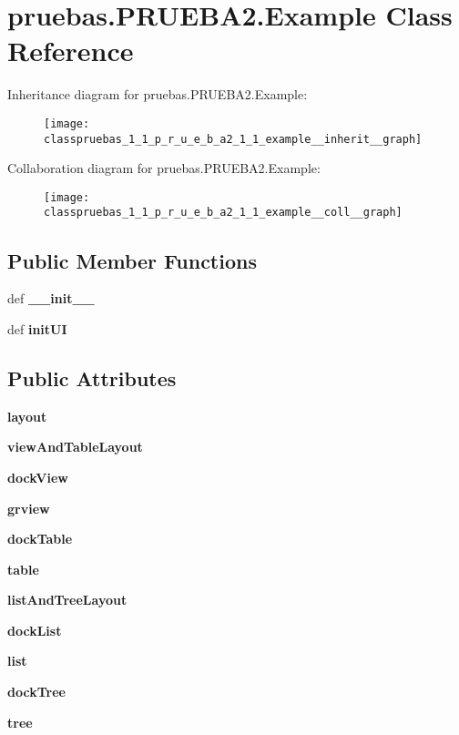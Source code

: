 \section{pruebas.\-P\-R\-U\-E\-B\-A2.\-Example \-Class \-Reference}
\label{classpruebas_1_1_p_r_u_e_b_a2_1_1_example}


\-Inheritance diagram for pruebas.\-P\-R\-U\-E\-B\-A2.\-Example\-:\nopagebreak
\begin{figure}[H]
\begin{center}
\leavevmode
\texttt{[image: classpruebas\_1\_1\_p\_r\_u\_e\_b\_a2\_1\_1\_example\_\_inherit\_\_graph]}
\end{center}
\end{figure}


\-Collaboration diagram for pruebas.\-P\-R\-U\-E\-B\-A2.\-Example\-:\nopagebreak
\begin{figure}[H]
\begin{center}
\leavevmode
\texttt{[image: classpruebas\_1\_1\_p\_r\_u\_e\_b\_a2\_1\_1\_example\_\_coll\_\_graph]}
\end{center}
\end{figure}
\subsection*{\-Public \-Member \-Functions}
\begin{DoxyCompactItemize}
\item 
def {\bf \-\_\-\-\_\-init\-\_\-\-\_\-}
\item 
def {\bf init\-U\-I}
\end{DoxyCompactItemize}
\subsection*{\-Public \-Attributes}
\begin{DoxyCompactItemize}
\item 
{\bf layout}
\item 
{\bf view\-And\-Table\-Layout}
\item 
{\bf dock\-View}
\item 
{\bf grview}
\item 
{\bf dock\-Table}
\item 
{\bf table}
\item 
{\bf list\-And\-Tree\-Layout}
\item 
{\bf dock\-List}
\item 
{\bf list}
\item 
{\bf dock\-Tree}
\item 
{\bf tree}
\end{DoxyCompactItemize}


